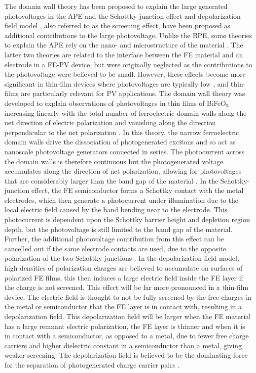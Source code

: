 The domain wall theory has been proposed to explain the large generated photovoltages in the APE \cite{domain_wall} and the Schottky-junction effect \cite{schottky_effect} and depolarization field model \cite{screen_effect, depol_model}, also referred to as the screening effect, have been proposed as additional contributions to the large photovoltage. Unlike the BPE, some theories to explain the APE rely on the nano- and microstructure of the material \cite{keith}. The latter two theories are related to the interface between the FE material and an electrode in a FE-PV device, but were originally neglected as the contributions to the photovoltage were believed to be small. However, these effects become more significant in thin-film devices where photovoltages are typically low \cite{FE_PV_rev1}, and thin-films are particularly relevant for PV applications.
The domain wall theory was developed to explain observations of photovoltages in thin films of BiFeO$_3$ increasing linearly with the total number of ferroelectric domain walls along the net direction of electric polarization and vanishing along the direction perpendicular to the net polarization \cite{rev_30}. In this theory, the narrow ferroelectric domain walls drive the dissociation of photogenerated excitons and so  act as nanoscale photovoltage generators connected in series. The photocurrent across the domain walls is therefore continuous but the photogenerated voltage accumulates along the direction of net polarization, allowing for photovoltages that are considerably larger than the band gap of the material \cite{FE_PV_rev1}.
In the Schottky-junction effect, the FE semiconductor forms a Schottky contact with the metal electrodes, which then generate a photocurrent under illumination due to the local electric field caused by the band bending near to the electrode. This photocurrent is dependent upon the Schottky barrier height and depletion region depth, but the photovoltage is still limited to the band gap of the material. Further, the additional photovoltage contribution from this effect can be cancelled out if the same electrode contacts are used, due to the opposite polarization of the two Schottky-junctions \cite{FE_PV_rev1}.
In the depolarization field model, high densities of polarization charges are believed to accumulate on surfaces of polarized FE films, this then induces a large electric field inside the FE layer if the charge is not screened. This effect will be far more pronounced in a thin-film device. The electric field is thought to not be fully screened by the free charges in the metal or semiconductor that the FE layer is in contact with, resulting in a depolarization field. This depolarization field will be larger when the FE material has a large remnant electric polarization, the FE layer is thinner and when it is in contact with a semiconductor, as opposed to a metal, due to fewer free charge carriers and higher dielectric constant in a semiconductor than a metal, giving weaker screening. The depolarization field is believed to be the dominating force for the separation of photogenerated charge carrier pairs \cite{FE_PV_rev1}.